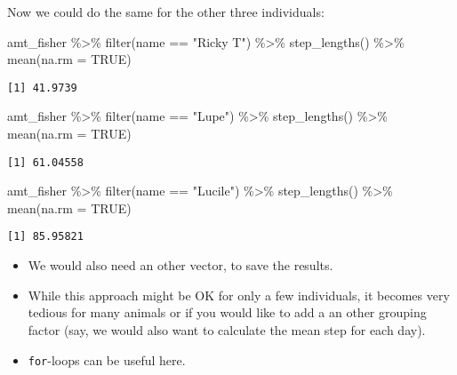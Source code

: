 \documentclass[ignorenonframetext,,t]{beamer}
\newenvironment{Shaded}{\begin{snugshade}}{\end{snugshade}}
\newcommand{\AttributeTok}[1]{\textcolor[rgb]{0.77,0.63,0.00}{#1}}
\newcommand{\ConstantTok}[1]{\textcolor[rgb]{0.00,0.00,0.00}{#1}}
\newcommand{\FunctionTok}[1]{\textcolor[rgb]{0.00,0.00,0.00}{#1}}
\newcommand{\NormalTok}[1]{#1}
\newcommand{\SpecialCharTok}[1]{\textcolor[rgb]{0.00,0.00,0.00}{#1}}
\newcommand{\StringTok}[1]{\textcolor[rgb]{0.31,0.60,0.02}{#1}}
\begin{document}
\begin{frame}[fragile]
Now we could do the same for the other three individuals:

\begin{Shaded}
\begin{Highlighting}[]
\NormalTok{amt\_fisher }\SpecialCharTok{\%\textgreater{}\%} \FunctionTok{filter}\NormalTok{(name }\SpecialCharTok{==} \StringTok{"Ricky T"}\NormalTok{) }\SpecialCharTok{\%\textgreater{}\%} 
  \FunctionTok{step\_lengths}\NormalTok{() }\SpecialCharTok{\%\textgreater{}\%} \FunctionTok{mean}\NormalTok{(}\AttributeTok{na.rm =} \ConstantTok{TRUE}\NormalTok{)}
\end{Highlighting}
\end{Shaded}

\begin{verbatim}
[1] 41.9739
\end{verbatim}

\begin{Shaded}
\begin{Highlighting}[]
\NormalTok{amt\_fisher }\SpecialCharTok{\%\textgreater{}\%} \FunctionTok{filter}\NormalTok{(name }\SpecialCharTok{==} \StringTok{"Lupe"}\NormalTok{) }\SpecialCharTok{\%\textgreater{}\%} 
  \FunctionTok{step\_lengths}\NormalTok{() }\SpecialCharTok{\%\textgreater{}\%} \FunctionTok{mean}\NormalTok{(}\AttributeTok{na.rm =} \ConstantTok{TRUE}\NormalTok{)}
\end{Highlighting}
\end{Shaded}

\begin{verbatim}
[1] 61.04558
\end{verbatim}

\begin{Shaded}
\begin{Highlighting}[]
\NormalTok{amt\_fisher }\SpecialCharTok{\%\textgreater{}\%} \FunctionTok{filter}\NormalTok{(name }\SpecialCharTok{==} \StringTok{"Lucile"}\NormalTok{) }\SpecialCharTok{\%\textgreater{}\%} 
  \FunctionTok{step\_lengths}\NormalTok{() }\SpecialCharTok{\%\textgreater{}\%} \FunctionTok{mean}\NormalTok{(}\AttributeTok{na.rm =} \ConstantTok{TRUE}\NormalTok{)}
\end{Highlighting}
\end{Shaded}

\begin{verbatim}
[1] 85.95821
\end{verbatim}
\end{frame}

\begin{frame}[fragile]
\begin{itemize}
\item
  We would also need an other vector, to save the results.
\item
  While this approach might be OK for only a few individuals, it becomes
  very tedious for many animals or if you would like to add a an other
  grouping factor (say, we would also want to calculate the mean step
  for each day).
\item
  \texttt{for}-loops can be useful here.
\end{itemize}
\end{frame}
\end{document}
